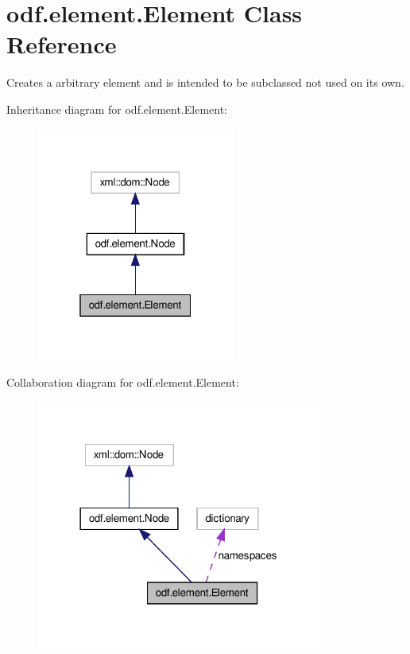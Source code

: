 \hypertarget{classodf_1_1element_1_1Element}{\section{odf.\+element.\+Element Class Reference}
\label{classodf_1_1element_1_1Element}
}


Creates a arbitrary element and is intended to be subclassed not used on its own.  




Inheritance diagram for odf.\+element.\+Element\+:
\nopagebreak
\begin{figure}[H]
\begin{center}
\leavevmode
\includegraphics[width=184pt]{classodf_1_1element_1_1Element__inherit__graph}
\end{center}
\end{figure}


Collaboration diagram for odf.\+element.\+Element\+:
\nopagebreak
\begin{figure}[H]
\begin{center}
\leavevmode
\includegraphics[width=266pt]{classodf_1_1element_1_1Element__coll__graph}
\end{center}
\end{figure}
